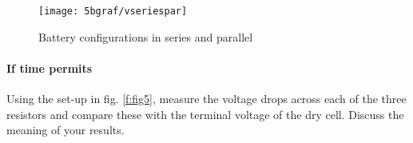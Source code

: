\begin{figure}[htb]
	\centering
	\texttt{[image: 5bgraf/vseriespar]} %
	\caption{Battery configurations in series and parallel}
	\label{f:vseriespar} %
\end{figure}

\paragraph{If time permits}  Using the set-up in fig. \ref{f:fig5}, measure the voltage drops across each of the three resistors and compare these with the terminal voltage of the dry cell.  Discuss the meaning of your results.


\endinput
